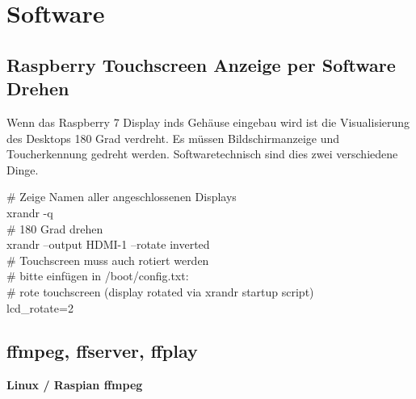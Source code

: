 \newpage
\section{Software}

\subsection{Raspberry Touchscreen Anzeige per Software Drehen}
Wenn das Raspberry 7\grqq{} Display inds Gehäuse eingebau wird ist die 
Visualisierung des Desktops 180 Grad verdreht. Es müssen Bildschirmanzeige 
und Toucherkennung gedreht werden. Softwaretechnisch sind dies zwei verschiedene 
Dinge.

\# Zeige Namen aller angeschlossenen Displays\\
xrandr -q\\

\# 180 Grad drehen\\
xrandr --output HDMI-1 --rotate inverted\\

\# Touchscreen muss auch rotiert werden\\
\# bitte einfügen in /boot/config.txt:\\
\# rote touchscreen (display rotated via xrandr startup script)\\
lcd\_rotate=2\\

\subsection{ffmpeg, ffserver, ffplay}

\textbf{Linux / Raspian ffmpeg} %

